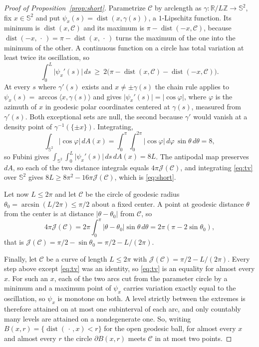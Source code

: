 \documentclass[10pt,a4paper]{amsart}
\newcommand{\R}{\mathbb{R}}
\newcommand{\Sph}{\mathbb{S}^{2}}
\DeclareMathOperator{\dist}{dist}
\begin{document}
\begin{proof}[Proof of Proposition~\ref{prop:short}]
Parametrize $\mathcal{C}$ by arclength as $\gamma\colon\R/L\mathbb{Z}\to\Sph$, fix
$x\in\Sph$ and put $\psi_{x}(s)=\dist(x,\gamma(s))$, a $1$-Lipschitz function.
Its minimum is $\dist(x,\mathcal{C})$ and its maximum is
$\pi-\dist(-x,\mathcal{C})$, because $\dist(-x,\,\cdot\,)=\pi-\dist(x,\,\cdot\,)$
turns the maximum of the one into the minimum of the other. A continuous
function on a circle has total variation at least twice its oscillation, so
\begin{equation}\label{eq:tv}
  \int_{0}^{L}\lvert\psi_{x}'(s)\rvert\,ds\ \ge\
  2\bigl(\pi-\dist(x,\mathcal{C})-\dist(-x,\mathcal{C})\bigr).
\end{equation}
At every $s$ where $\gamma'(s)$ exists and $x\ne\pm\gamma(s)$ the chain rule
applies to $\psi_{x}(s)=\arccos\langle x,\gamma(s)\rangle$ and gives
$\lvert\psi_{x}'(s)\rvert=\lvert\cos\varphi\rvert$, where $\varphi$ is the azimuth
of $x$ in geodesic polar coordinates centered at $\gamma(s)$, measured from
$\gamma'(s)$. Both exceptional sets are null, the second because $\gamma'$ would
vanish at a density point of $\gamma^{-1}(\{\pm x\})$. Integrating,
\[
  \int_{\Sph}\lvert\cos\varphi\rvert\,dA(x)
  =\int_{0}^{\pi}\!\!\int_{0}^{2\pi}\lvert\cos\varphi\rvert\,d\varphi\,\sin\theta\,d\theta
  =8 ,
\]
so Fubini gives $\int_{\Sph}\int_{0}^{L}\lvert\psi_{x}'(s)\rvert\,ds\,dA(x)=8L$. The
antipodal map preserves $dA$, so each of the two distance integrals equals
$4\pi\mathcal{J}(\mathcal{C})$, and integrating \eqref{eq:tv} over $\Sph$ gives
$8L\ge8\pi^{2}-16\pi\mathcal{J}(\mathcal{C})$, which is \eqref{eq:short}.

Let now $L\le2\pi$ and let $\mathcal{C}$ be the circle of geodesic radius
$\theta_{0}=\arcsin(L/2\pi)\le\pi/2$ about a fixed center. A point at geodesic
distance $\theta$ from the center is at distance $\lvert\theta-\theta_{0}\rvert$
from $\mathcal{C}$, so
\[
  4\pi \mathcal{J}(\mathcal{C})
  =2\pi\int_{0}^{\pi}\lvert\theta-\theta_{0}\rvert\sin\theta\,d\theta
  =2\pi(\pi-2\sin\theta_{0}),
\]
that is $\mathcal{J}(\mathcal{C})=\pi/2-\sin\theta_{0}=\pi/2-L/(2\pi)$.

Finally, let $\mathcal{C}$ be a curve of length $L\le2\pi$ with
$\mathcal{J}(\mathcal{C})=\pi/2-L/(2\pi)$. Every step above except \eqref{eq:tv}
was an identity, so \eqref{eq:tv} is an equality for almost every $x$. For such
an $x$, each of the two arcs cut from the parameter circle by a minimum and a
maximum point of $\psi_{x}$ carries variation exactly equal to the oscillation,
so $\psi_{x}$ is monotone on both. A level strictly between the extremes is
therefore attained on at most one subinterval of each arc, and only countably
many levels are attained on a nondegenerate one. So, writing
$B(x,r)=\{\dist(\,\cdot\,,x)<r\}$ for the open geodesic ball, for almost every
$x$ and almost every $r$ the circle $\partial B(x,r)$ meets $\mathcal{C}$ in at
most two points.


\end{proof}
\end{document}
